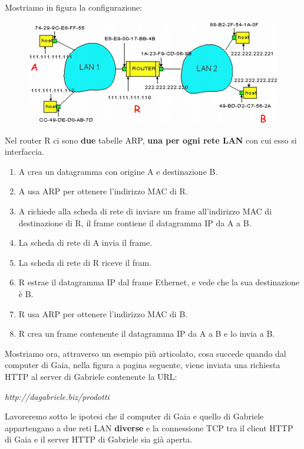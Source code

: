 \documentclass[11pt,a4paper,oneside]{book}
\theoremstyle{definition}
\begin{document}
Mostriamo in figura la configurazione:

\begin{figure}[!h]
	\includegraphics[scale=0.5]{Immagini/ARP_example.png}
	\centering
\end{figure}

Nel router R ci sono \textbf{due} tabelle ARP, \textbf{una per ogni rete LAN} con cui esso si interfaccia.

\begin{enumerate}
	\item A crea un datagramma con origine A e destinazione B.
	\item A usa ARP per ottenere l’indirizzo MAC di R.
	\item A richiede alla scheda di rete di inviare un frame all’indirizzo MAC di
	      destinazione di R, il frame contiene il datagramma IP da A a B.
	\item La scheda di rete di A invia il frame.
	\item La scheda di rete di R riceve il fram.
	\item R estrae il datagramma IP dal frame Ethernet, e vede che la sua destinazione è B.
	\item R usa ARP per ottenere l’indirizzo MAC di B.
	\item R crea un frame contenente il datagramma IP da A a B e lo invia a B.
\end{enumerate}

Mostriamo ora, attraverso un esempio più articolato, cosa succede quando dal computer di Gaia, nella figura a pagina seguente, viene inviata una richiesta HTTP al server di Gabriele contenente la URL:

\begin{center}
	\textit{http://dagabriele.biz/prodotti}
\end{center}

Lavoreremo sotto le ipotesi che il computer di Gaia e quello di Gabriele appartengano a due reti LAN \textbf{diverse} e la connessione TCP tra il client HTTP di Gaia e il server HTTP di Gabriele sia già aperta.
\end{document}
